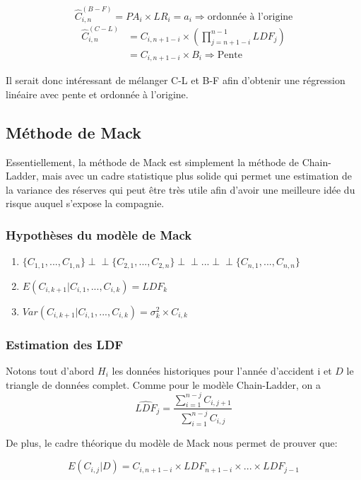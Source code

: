 $$\widehat{C}_{i,n}^{(B-F)}=PA_i \times LR_i = a_i \Rightarrow \text{ordonnée à l'origine}$$
$$\begin{aligned}
\widehat{C}_{i,n}^{(C-L)}&=C_{i,n+1-i} \times \left(\prod_{j=n+1-i}^{n-1} LDF_j \right) \\
                    &= C_{i,n+1-i} \times B_i \Rightarrow \text{Pente}
\end{aligned}$$

Il serait donc intéressant de mélanger C-L et B-F afin d'obtenir une régression linéaire avec pente et ordonnée à l'origine.

\subsection*{Méthode de Mack}

Essentiellement, la méthode de Mack est simplement la méthode de Chain-Ladder, mais avec un cadre statistique plus solide qui permet une estimation de la variance des réserves qui peut être très utile afin d'avoir une meilleure idée du risque auquel s'expose la compagnie.

\subsubsection*{ Hypothèses du modèle de Mack}

\begin{enumerate}
\item $\{C_{1,1},...,C_{1,n} \}\perp\!\!\!\perp \{C_{2,1},...,C_{2,n} \} \perp\!\!\!\perp...\perp\!\!\!\perp \{C_{n,1},...,C_{n,n} \}$
\item $ E(C_{i,k+1} | C_{i,1},...,C_{i,k})=LDF_k$
\item $Var(C_{i,k+1} | C_{i,1},...,C_{i,k}) = \sigma_k^2 \times C_{i,k}$
\end{enumerate}


\subsubsection*{ Estimation des LDF}

Notons tout d'abord $H_i$ les données historiques pour l'année d'accident i et $D$ le triangle de données complet. Comme pour le modèle Chain-Ladder, on a
$$\widehat{LDF}_j=\frac{\sum_{i=1}^{n-j} C_{i,j+1}}{\sum_{i=1}^{n-j} C_{i,j}}$$

De plus, le cadre théorique du modèle de Mack nous permet de prouver que:

$$E(C_{i,j}|D)=C_{i,n+1-i} \times LDF_{n+1-i}\times...\times LDF_{j-1}$$


